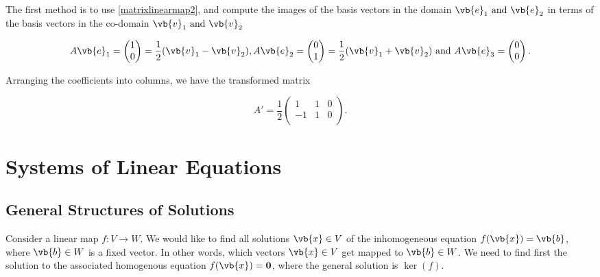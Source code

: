 \documentclass[a4paper,12pt]{report}
\begin{document}
{The first method is to use \cref{matrixlinearmap2}, and compute the images of the basis vectors in the domain \(\vb{e} _{1} \text { and } \vb{e} _{2} \) in terms of the basis vectors in the co-domain \(\vb{v} _{1} \text { and } \vb{v} _{2} \)

\begin{equation}
    A \vb{e} _{1} = \begin{pmatrix}
         1 \\
         0 \\
    \end{pmatrix} = \frac{1}{2}(\vb{v} _{1} - \vb{v} _{2}  ),  A\vb{e} _{2} = \begin{pmatrix}
         0 \\
         1 \\
    \end{pmatrix} = \frac{1}{2} (\vb{v} _{1}+ \vb{v} _{2}  ) \text { and } A\vb{e} _{3} = \begin{pmatrix}
         0 \\
         0 \\
    \end{pmatrix}.
\end{equation}

Arranging the coefficients into columns, we have the transformed matrix 

\begin{equation}
    A' = \frac{1}{2} \begin{pmatrix}
        1 &  1 & 0 \\
        -1 &  1 & 0 \\
    \end{pmatrix}.
\end{equation}
} 


\section{Systems of Linear Equations}

\subsection{General Structures of Solutions}

Consider a linear map \(f:V \to W\). We would like to find all solutions \(\vb{x} \in V\) of the inhomogeneous equation \(f(\vb{x} ) = \vb{b} \), where \(\vb{b} \in W\) is a fixed vector. In other words, which vectors \(\vb{x}  \in V\) get mapped to \(\vb{b} \in W\). We need to find first the solution to the associated homogenous equation \(f(\vb{x} ) = \boldsymbol{0} \), where the general solution is \(\ker (f)\).       
\end{document}
